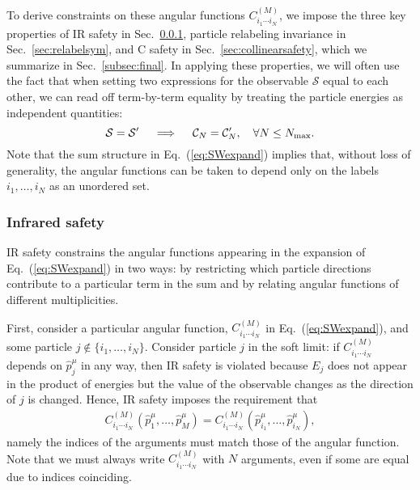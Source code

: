 \documentclass[letterpaper,11pt]{article}
\DeclareRobustCommand{\Sec}[1]{Sec.~\ref{#1}}
\DeclareRobustCommand{\Eq}[1]{Eq.~(\ref{#1})}
\begin{document}
To derive constraints on these angular functions $C^{(M)}_{i_1 \cdots i_N}$, we impose the three key properties of IR safety in \Sec{sec:irsafety}, particle relabeling invariance in \Sec{sec:relabelsym}, and C safety in \Sec{sec:collinearsafety}, which we summarize in \Sec{subsec:final}.
%
In applying these properties, we will often use the fact that when setting two expressions for the observable $\mathcal S$ equal to each other, we can read off term-by-term equality by treating the particle energies as independent quantities:
\begin{equation}\label{eq:equality}
\mathcal S=\mathcal S'\quad\implies\quad \mathcal C_N=\mathcal C'_N,\quad\forall N\le N_{\rm max}.
\end{equation}
Note that the sum structure in \Eq{eq:SWexpand} implies that, without loss of generality, the angular functions can be taken to depend only on the labels $i_1,\ldots,i_N$ as an unordered set.


\subsubsection{Infrared safety}
\label{sec:irsafety}

IR safety constrains the angular functions appearing in the expansion of \Eq{eq:SWexpand} in two ways: by restricting which particle directions contribute to a particular term in the sum and by relating angular functions of different multiplicities.

First, consider a particular angular function, $C^{(M)}_{i_1\cdots i_N}$ in \Eq{eq:SWexpand}, and some particle $j\not\in\{ i_1,\ldots, i_N\}$. Consider particle $j$ in the soft limit: if $C^{(M)}_{i_1\cdots i_N}$ depends on $\hat p_j^\mu$ in any way, then IR safety is violated because $E_j$ does not appear in the product of energies but the value of the observable changes as the direction of $j$ is changed.
%
Hence, IR safety imposes the requirement that
\begin{align}\label{eq:IRresult1}
C^{(M)}_{i_1\cdots i_N}(\hat p_1^\mu,\ldots,\hat p_M^\mu)=C^{(M)}_{i_1\cdots i_N}(\hat p_{i_1}^\mu,\ldots,\hat p_{i_N}^\mu),
\end{align}
namely the indices of the arguments must match those of the angular function.
%
Note that we must always write $C^{(M)}_{i_1\cdots i_N}$ with $N$ arguments, even if some are equal due to indices coinciding.
\end{document}
